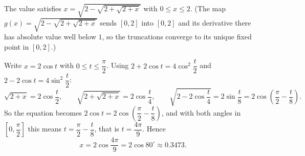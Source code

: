 The value satisfies $x=\sqrt{2-\sqrt{2+\sqrt{2+x}}}$ with $0\le x\le 2$. (The map $g(x)=\sqrt{2-\sqrt{2+\sqrt{2+x}}}$ sends $[0,2]$ into $[0,2]$ and its derivative there has absolute value well below $1$, so the truncations converge to its unique fixed point in $[0,2]$.)

Write $x=2\cos t$ with $0\le t\le\dfrac{\pi}{2}$. Using $2+2\cos t=4\cos^2\dfrac{t}{2}$ and $2-2\cos t=4\sin^2\dfrac{t}{2}$:
\[
\sqrt{2+x}=2\cos\dfrac{t}{2},\qquad \sqrt{2+\sqrt{2+x}}=2\cos\dfrac{t}{4},\qquad \sqrt{2-2\cos\dfrac{t}{4}}=2\sin\dfrac{t}{8}=2\cos\left(\dfrac{\pi}{2}-\dfrac{t}{8}\right).
\]
So the equation becomes $2\cos t=2\cos\left(\dfrac{\pi}{2}-\dfrac{t}{8}\right)$, and with both angles in $\left[0,\dfrac{\pi}{2}\right]$ this means $t=\dfrac{\pi}{2}-\dfrac{t}{8}$, that is $t=\dfrac{4\pi}{9}$. Hence
\[
x=\boxed{2\cos\dfrac{4\pi}{9}=2\cos80^\circ}\approx0.3473 .
\]
